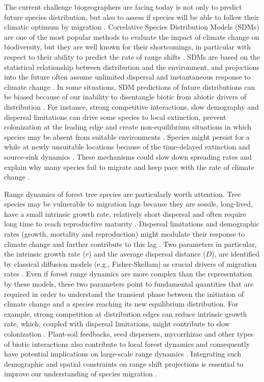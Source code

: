 The current challenge biogeographers are facing today is not only to predict future species
distribution, but also to assess if species will be able to follow their climatic optimum by
migration \citep{Lenoir2014a,Renwick2014}. Correlative Species Distribution Models (SDMs) are one of
the most popular methods to evaluate the impact of climate change on biodiversity, but they are well
known for their shortcomings, in particular with respect to their ability to predict the rate of
range shifts \citep{Thuiller2008, Guisan2005a}. SDMs are based on the statistical relationship
between distribution and the environment, and projections into the future often assume unlimited
dispersal and instantaneous response to climate change \citep{Thuiller2008}. In some situations, SDM
predictions of future distributions can be biased because of our inability to disentangle biotic
from abiotic drivers of distribution \citep{Kissling2012,Wisz2013}. For instance, strong competitive
interactions, slow demography and dispersal limitations can drive some species to local extinction,
prevent colonization at the leading edge and create non-equilibrium situations in which species may
be absent from suitable environments \citep{Boulangeat2012a,Pulliam2000}. Species might persist for
a while at newly unsuitable locations because of the time-delayed extinction and source-sink
dynamics \citep{Schurr2012}. These mechanisms could slow down spreading rates and explain why many
species fail to migrate \citep{Zhu2012} and keep pace with the rate of climate change
\citep{Renwick2014,Svenning2004,Lenoir2014a}.

Range dynamics of forest tree species are particularly worth attention. Tree species may be
vulnerable to migration lags because they are sessile, long-lived, have a small intrinsic growth
rate, relatively short dispersal and often require long time to reach reproductive maturity
\citep{Renwick2014,Vanderwel2014}. Dispersal limitations and demographic rates (growth, mortality
and reproduction) might modulate their response to climate change and further contribute to this lag
\citep{Svenning2014a}. Two parameters in particular, the intrinsic growth rate ($r$) and the average
dispersal distance ($D$), are identified by classical diffusion models (e.g., Fisher-Skellam) as
crucial drivers of migration rates \citep{SKELLAM01061951,Svenning2014a}. Even if forest range
dynamics are more complex than the representation by these models, these two parameters point to
fundamental quantities that are required in order to understand the transient phase between the
initiation of climate change and a species reaching its new equilibrium distribution. For example,
strong competition at distribution edges can reduce intrinsic growth rate, which, coupled with
dispersal limitations, might contribute to slow colonization \citep{Moorcroft2006}. Plant-soil
feedbacks, seed dispersers, mycorrhizae and other types of biotic interactions also contribute to
local forest dynamics and consequently have potential implications on large-scale range dynamics
\citep{Afkhami2014, Ricklefs2004, Wootton2001a}. Integrating such demographic and spatial
constraints on range shift projections is essential to improve our understanding of species
migration \citep{Normand2014a}.

